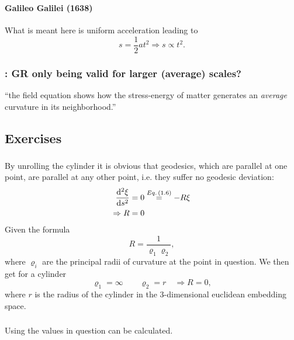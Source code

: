 \subsubsection{ }
\paragraph{Galileo Galilei (1638)}
What is meant here is uniform acceleration leading to
\[s=\dfrac{1}{2}a t^2 \Rightarrow s \propto t^2.\]

\subsubsection{\hint: GR only being valid for larger (average) scales? }
\enquote{the field equation shows how the stress-energy of matter generates an \emph{average} curvature in its neighborhood.}

\subsection{Exercises}\label{susec:1_E}
\subsubsection{ }
By unrolling the cylinder it is obvious that geodesics, which are parallel at one point, are parallel at any other point, i.e. they suffer no geodesic deviation:
\begin{align*} 
	\derivative{^2\xi}{s^2}&=0\overset{\eq{1.6}}{=}-R\xi\\
	\Rightarrow R&=0
\end{align*}
Given the formula \[R=\dfrac{1}{\varrho_1\varrho_2},\]
where $\varrho_i$ are the principal radii of curvature at the point in question.
We then get for a cylinder \[\varrho_1=\infty\qquad\varrho_2=r \quad\Rightarrow R=0,\]
where $r$ is the radius of the cylinder in the 3-dimensional euclidean embedding space.
\subsubsection{ }
Using  the values in question can be calculated.

